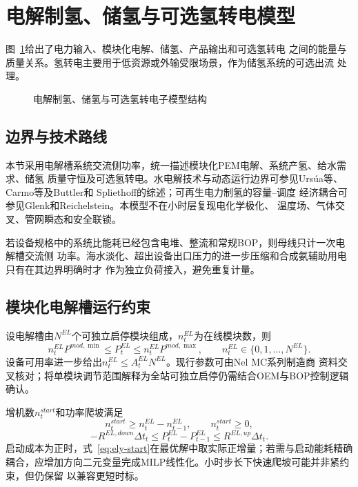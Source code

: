 \section{电解制氢、储氢与可选氢转电模型}
\label{sec:hydrogen}

图~\ref{fig:hydrogen-model}给出了电力输入、模块化电解、储氢、产品输出和可选氢转电
之间的能量与质量关系。氢转电主要用于低资源或外输受限场景，作为储氢系统的可选出流
处理。
\begin{figure}[H]
\centering
\resizebox{0.92\textwidth}{!}{}
\caption{电解制氢、储氢与可选氢转电子模型结构}
\label{fig:hydrogen-model}
\end{figure}

\subsection{边界与技术路线}

本节采用电解槽系统交流侧功率，统一描述模块化PEM电解、系统产氢、给水需求、储氢
质量守恒及可选氢转电。水电解技术与动态运行边界可参见Ursúa等、Carmo等及Buttler和
Spliethoff的综述\cite{ursua2012,carmo2013,buttler2018}；可再生电力制氢的容量--调度
经济耦合可参见Glenk和Reichelstein\cite{glenk2019}。本模型不在小时层复现电化学极化、
温度场、气体交叉、管网瞬态和安全联锁。

若设备规格中的系统比能耗已经包含电堆、整流和常规BOP，则母线只计一次电解槽交流侧
功率。海水淡化、超出设备出口压力的进一步压缩和合成氨辅助用电只有在其边界明确时才
作为独立负荷接入，避免重复计量。

\subsection{模块化电解槽运行约束}

设电解槽由$N^{EL}$个可独立启停模块组成，$n_t^{EL}$为在线模块数，则
\begin{equation}
n_t^{EL}P^{mod,\min}\le P_t^{EL}
\le n_t^{EL}P^{mod,\max},\qquad
n_t^{EL}\in\{0,1,\ldots,N^{EL}\}.
\label{eq:ely-module}
\end{equation}
设备可用率进一步给出$n_t^{EL}\le A_t^{EL}N^{EL}$。现行参数可由Nel MC系列制造商
资料交叉核对\cite{nel-mc}；将单模块调节范围解释为全站可独立启停仍需结合OEM与BOP控制逻辑确认。

增机数$n_t^{start}$和功率爬坡满足
\begin{equation}
n_t^{start}\ge n_t^{EL}-n_{t-1}^{EL},\qquad n_t^{start}\ge0,
\label{eq:ely-start}
\end{equation}
\begin{equation}
-R^{EL,down}\Delta t_t\le P_t^{EL}-P_{t-1}^{EL}
\le R^{EL,up}\Delta t_t.
\label{eq:ely-ramp}
\end{equation}
启动成本为正时，式~\eqref{eq:ely-start}在最优解中取实际正增量；若需与启动能耗精确
耦合，应增加方向二元变量完成MILP线性化。小时步长下快速爬坡可能并非紧约束，但仍保留
以兼容更短时标。

